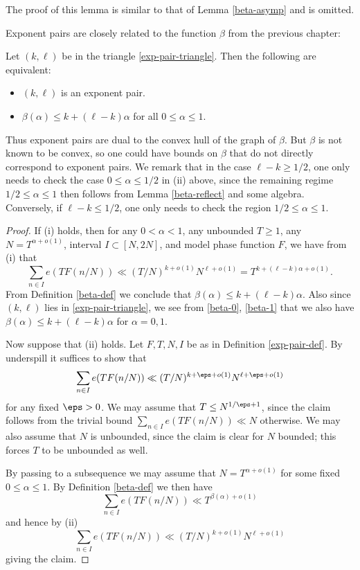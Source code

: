 The proof of this lemma is similar to that of Lemma \ref{beta-asymp} and is omitted.

Exponent pairs are closely related to the function $\beta$ from the previous chapter:

\begin{lemma}\label{beta-duality}  Let $(k,\ell)$ be in the triangle \eqref{exp-pair-triangle}.  Then the following are equivalent:
    \begin{itemize}
    \item[(i)] $(k,\ell)$ is an exponent pair.
    \item[(ii)] $\beta(\alpha) \leq k + (\ell-k)\alpha$ for all $0 \leq \alpha \leq 1$.
    \end{itemize}
    \end{lemma}


Thus exponent pairs are dual to the convex hull of the graph of $\beta$.  But $\beta$ is not known to be convex, so one could have bounds on $\beta$ that do not directly correspond to exponent pairs.  We remark that in the case $\ell - k \geq 1/2$, one only needs to check the case $0 \leq \alpha \leq 1/2$ in (ii) above, since the remaining regime $1/2 \leq \alpha \leq 1$ then follows from Lemma \ref{beta-reflect} and some algebra.  Conversely, if $\ell - k \leq 1/2$, one only needs to check the region $1/2 \leq \alpha \leq 1$.

\begin{proof}  If (i) holds, then for any $0 < \alpha < 1$, any unbounded $T \geq 1$, any $N = T^{\alpha+o(1)}$, interval $I \subset [N,2N]$, and model phase function $F$, we have from (i) that
$$ \sum_{n \in I} e(T F(n/N)) \ll (T/N)^{k+o(1)} N^{\ell+o(1)} = T^{k + (\ell-k)\alpha + o(1)}.$$
From Definition \ref{beta-def} we conclude that $\beta(\alpha) \leq k + (\ell-k) \alpha$.  Also since $(k,\ell)$ lies in \eqref{exp-pair-triangle}, we see from \eqref{beta-0}, \eqref{beta-1} that we also have $\beta(\alpha) \leq k + (\ell-k) \alpha$ for $\alpha=0,1$.

Now suppose that (ii) holds.  Let $F, T, N, I$ be as in Definition \ref{exp-pair-def}.  By underspill it suffices to show that
$$ \sum_{n \in I} e(T F(n/N)) \ll (T/N)^{k+\eps+o(1)} N^{\ell+\eps+o(1)}$$
for any fixed $\eps>0$.  We may assume that $T \leq N^{1/\eps+1}$, since the claim follows from the trivial bound $\sum_{n \in I} e(T F(n/N)) \ll N$ otherwise.  We may also assume that $N$ is unbounded, since the claim is clear for $N$ bounded; this forces $T$ to be unbounded as well.

By passing to a subsequence we may assume that $N = T^{\alpha+o(1)}$ for some fixed $0 \leq \alpha \leq 1$.  By Definition \ref{beta-def} we then have
$$ \sum_{n \in I} e(T F(n/N)) \ll T^{\beta(\alpha)+o(1)}$$
and hence by (ii)
$$ \sum_{n \in I} e(T F(n/N)) \ll (T/N)^{k+o(1)} N^{\ell+o(1)}$$
giving the claim.
\end{proof}


